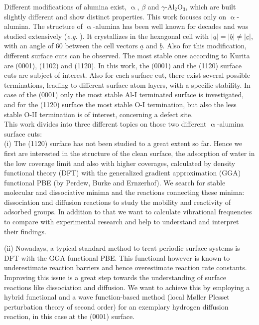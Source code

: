 \documentclass[11pt,DIV=13,BCOR=5mm,a4paper,headinclude]{scrbook}
\renewcommand{\vec}[1]{\underline{#1}}
\begin{document}
Different modifications of alumina exist, $\upalpha$, $\beta$ and $\gamma$-Al$_2$O$_3$, which are built slightly different and show distinct properties.
This work focuses only on $\upalpha$-alumina.
The structure of $\upalpha$-alumina has been well known for decades and was studied extensively (\textit{e.g.} \cite{Passerini1930,wyckoff1931}).
It crystallizes in the hexagonal cell with $|\vec{a}|=|\vec{b}|\neq |\vec{c}|$, with an angle of $60$\textdegree{} between the cell vectors $\vec{a}$ and $\vec{b}$.
Also for this modification, different surface cuts can be observed. 
The most stable ones according to Kurita\cite{kuri10} are (0001), (1\=102) and (11\=20).
In this work, the (0001) and the (11\=20) surface cuts are subject of interest.
Also for each surface cut, there exist several possible terminations, leading to different surface atom layers, with a specific stability.
In case of the (0001) only the most stable Al-I terminated surface is investigated, and for the (11\=20) surface the most stable O-I termination, but also the less stable O-II termination is of interest, concerning a defect site.
\\

This work divides into three different topics on those two different $\upalpha$-alumina surface cuts:\\
(i) The (11\=20) surface has not been studied to a great extent so far.
Hence we first are interested in the structure of the clean surface, the adsorption of water in the low coverage limit and also with higher coverages, calculated by density functional theory (DFT) with the  generalized gradient approximation (GGA) functional PBE (by Perdew, Burke and Ernzerhof).
We search for stable molecular and dissociative minima and the reactions connecting these minima: dissociation and diffusion reactions to study the mobility and reactivity of adsorbed groups.
In addition to that we want to calculate vibrational frequencies to compare with experimental research and help to understand and interpret their findings.


(ii) Nowadays, a typical standard method to treat periodic surface systems is DFT with the GGA functional PBE.
This functional however is known to underestimate reaction barriers and hence overestimate reaction rate constants.
Improving this issue is a great step towards the understanding of surface reactions like dissociation and diffusion.
We want to achieve this by employing a hybrid functional and a wave function-based method (local M\o{}ller Plesset perturbation theory of second order) for an exemplary hydrogen diffusion reaction, in this case at the (0001) surface.
\end{document}
